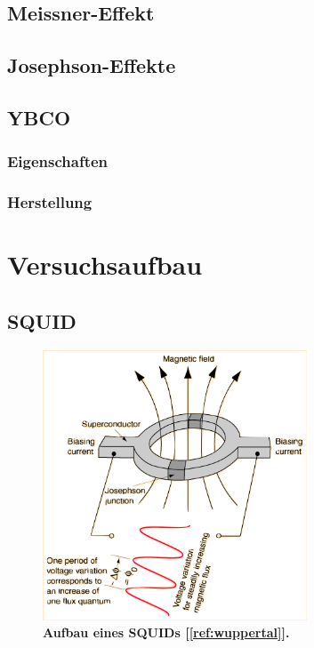 \documentclass[a4paper,ngerman]{scrartcl}
\begin{document}
\subsection{Meissner-Effekt}

\subsection{Josephson-Effekte}


\subsection{YBCO}

\subsubsection{Eigenschaften}

\subsubsection{Herstellung}


\section{Versuchsaufbau}

\subsection{SQUID}

\begin{figure}
\centering
\includegraphics[width=0.7\textwidth]{abbildungen/squide.png}
\caption[Versuchsplatz]{\textbf{Aufbau eines SQUIDs [\ref{ref:wuppertal}].}}
\label{fig:squid_wuppertal}
\end{figure}
\end{document}
